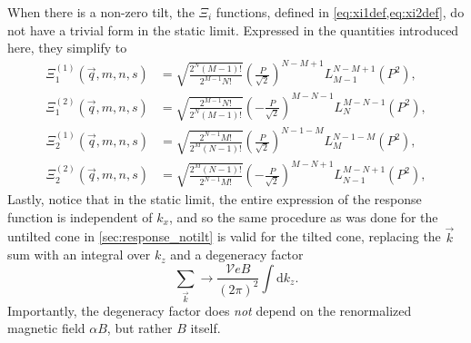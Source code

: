 When there is a non-zero tilt, the \( \Xi_{i} \) functions, defined in \cref{eq:xi1def,eq:xi2def}, do not have a trivial form in the static limit.
Expressed in the quantities introduced here, they simplify to
\begin{subequations}
  \begin{align}
    \Xi_1 ^{(1)}(\vec{q}, m, n, s) &= \sqrt{\frac{2^N (M-1)!}{2^{M-1} N!}}
                                     \left( \frac{P}{\sqrt{2}} \right)^{N-M + 1}
                                     L^{N-M+1}_{M-1} \left( P^2 \right),\\
    \Xi_1 ^{(2)}(\vec{q}, m, n, s) &= \sqrt{\frac{2^{M-1} N!}{2^N (M-1)!}}
                                     \left( -\frac{P}{\sqrt{2}} \right)^{M-N - 1}
                                     L^{M - N - 1}_N \left( P^2 \right),
  \end{align}
\end{subequations}
\begin{subequations}
  \begin{align}
    \Xi_2 ^{(1)}(\vec{q}, m, n, s) &= \sqrt{\frac{2^{N-1} M!}{2^M (N-1)!}}
                                     \left( \frac{P}{\sqrt{2}} \right)^{N-1 - M}
                                     L^{N-1 -M}_{M} \left( P^2 \right),\\
    \Xi_2 ^{(2)}(\vec{q}, m, n, s) &= \sqrt{\frac{2^M (N-1)!}{2^{N-1} M!}}
                                     \left( -\frac{P}{\sqrt{2}} \right)^{M-N + 1}
                                     L^{M - N + 1}_{N-1} \left( P^2 \right),
  \end{align}
\end{subequations}
Lastly, notice that in the static limit, the entire expression of the response function is independent of \( k_x \), and so the same procedure as was done for the untilted cone in \cref{sec:response_notilt} is valid for the tilted cone, replacing the \( \vec{k} \) sum with an integral over \( k_z \) and a degeneracy factor
\begin{equation}
  \label{eq:113}
  \sum\limits_{\vec{k}}^{} \to \frac{\mathcal{V} e B}{(2\pi)^2 } \int \mathrm{d} k_z.
\end{equation}
Importantly, the degeneracy factor does \emph{not} depend on the renormalized magnetic field \( \alpha B \), but rather \( B \) itself.

